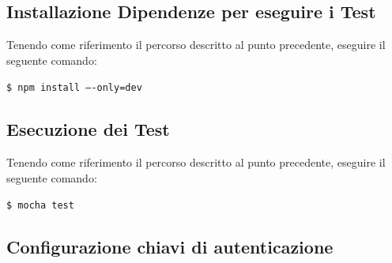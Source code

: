 \documentclass[../ManualeSviluppatore_v2.0.0.tex]{subfiles}
\begin{document}
	\subsection{Installazione Dipendenze per eseguire i Test}
		Tenendo come riferimento il percorso descritto al punto precedente, eseguire il seguente comando:
			\begin{center}
				\texttt{\$ npm install ----only=dev}
			\end{center}
	\subsection{Esecuzione dei Test}
		Tenendo come riferimento il percorso descritto al punto precedente, eseguire il seguente comando:
			\begin{center}
				\texttt{\$ mocha test}
			\end{center}
	\subsection{Configurazione chiavi di autenticazione}
\end{document}

